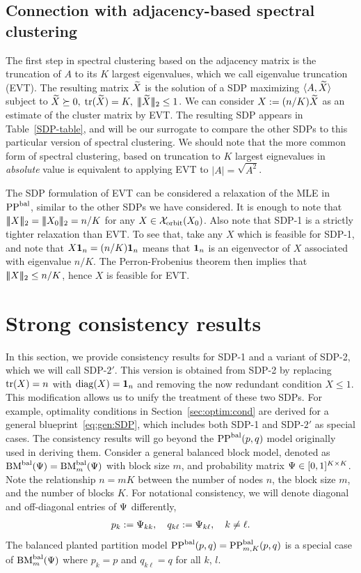 \subsection{Connection with adjacency-based spectral clustering}\label{sec:EVT:connection}
The first step in spectral clustering based on the adjacency matrix is the truncation of $A$ to its $K$ largest eigenvalues, which we call eigenvalue truncation (EVT). The resulting matrix $\widetilde{X}$ is the solution of a SDP maximizing $\langle A,\widetilde{X}\rangle$ subject to $\widetilde{X} \succeq 0,\; \operatorname*{tr}(\widetilde{X}) = K,\; |\!|\!|\widetilde{X}|\!|\!|_2 \le 1$. We can consider $X := (n/K) \widetilde{X}$ as an estimate of the cluster matrix by EVT. The resulting SDP appears in Table~\ref{SDP-table}, and will be our surrogate to compare the other SDPs to this particular version of spectral clustering. We should note that the more common form of spectral clustering, based on truncation to $K$ largest eignevalues in \emph{absolute} value is equivalent to applying EVT to $|A| = \sqrt{A^2}$.

The SDP formulation of EVT can be considered a relaxation of the MLE in $\text{PP}^{\text{bal}}$, similar to the other SDPs we have considered. It is enough to note that $\mnorm{X}_2 = \mnorm{X_0}_2 = n/K$ for any $X \in \mathcal{X}_{\text{orbit}}{(}X_0)$.  Also note that SDP-1 is a strictly tighter relaxation than  EVT.  To see that, take any $X$ which is feasible for SDP-1, and note that $X \bm{1}_n = (n/K) \bm{1}_n$ means that $\bm{1}_n$ is an eigenvector of $X$ associated with eigenvalue $n/K$. The Perron-Frobenius theorem then implies that $|\!|\!|X|\!|\!|_2 \le n/K$, hence $X$ is feasible for EVT.


\section{Strong consistency results}\label{sec:consist:results}
In this section, we provide consistency results for SDP-1 and a variant of SDP-2, which we will call SDP-$2'$. This version is obtained from SDP-2 by replacing $\operatorname*{tr}(X) = n$ with $\operatorname{diag}(X) = \bm{1}_n$ and removing the now redundant condition $X \le 1$.
This modification allows us to unify the  treatment of these two SDPs. For example, optimality conditions in Section~\ref{sec:optim:cond} are derived for a general blueprint~\eqref{eq:gen:SDP}, which includes both SDP-1 and SDP-$2'$ as special cases. The consistency results will go beyond the $\text{PP}^{\text{bal}}(p,q)$ model originally used in deriving them.   Consider a general balanced block model, denoted as $\textrm{BM}^{\textrm{bal}}(\Psi) = \textrm{BM}^{\textrm{bal}}_m(\Psi)$ with block size $m$, and probability matrix $\Psi \in [0,1]^{K \times K}$. Note the relationship $ n = m K$
between the number of nodes $n$, the block size $m$, and the number of blocks $K$. 
For notational consistency, we will denote diagonal and off-diagonal entries of $\Psi$ differently,
\begin{align}\label{eq:Psi:element:naming}
  p_k := \Psi_{kk}, \quad q_{k \ell} := \Psi_{k \ell}, \quad k \neq \ell.
\end{align}
The balanced planted partition model $\text{PP}^{\text{bal}}(p,q) = \text{PP}^{\text{bal}}_{m,K}(p,q)$ is a special case of $ \textrm{BM}^{\textrm{bal}}_m(\Psi)$ where $p_k = p$ and $q_{k \ell} = q$ for all $k$, $l$. %
 
